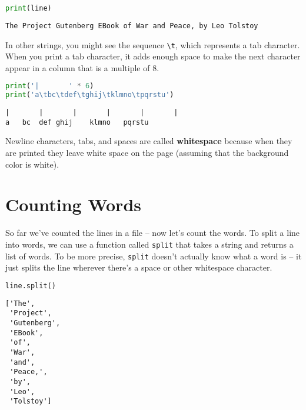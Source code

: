 \begin{lstlisting}[language=Python,style=source]
print(line)
\end{lstlisting}

\begin{lstlisting}[style=output]
The Project Gutenberg EBook of War and Peace, by Leo Tolstoy
\end{lstlisting}

In other strings, you might see the sequence
\passthrough{\lstinline!\\t!}, which represents a tab character. When
you print a tab character, it adds enough space to make the next
character appear in a column that is a multiple of 8.

\begin{lstlisting}[language=Python,style=source]
print('|       ' * 6)
print('a\tbc\tdef\tghij\tklmno\tpqrstu')
\end{lstlisting}

\begin{lstlisting}[style=output]
|       |       |       |       |       |       
a   bc  def ghij    klmno   pqrstu
\end{lstlisting}

Newline characters, tabs, and spaces are called \textbf{whitespace}
because when they are printed they leave white space on the page
(assuming that the background color is white).

\section{Counting Words}\label{counting-words}

So far we've counted the lines in a file -- now let's count the words.
To split a line into words, we can use a function called
\passthrough{\lstinline!split!} that takes a string and returns a list
of words. To be more precise, \passthrough{\lstinline!split!} doesn't
actually know what a word is -- it just splits the line wherever there's
a space or other whitespace character.

\begin{lstlisting}[language=Python,style=source]
line.split()
\end{lstlisting}

\begin{lstlisting}[style=output]
['The',
 'Project',
 'Gutenberg',
 'EBook',
 'of',
 'War',
 'and',
 'Peace,',
 'by',
 'Leo',
 'Tolstoy']
\end{lstlisting}

